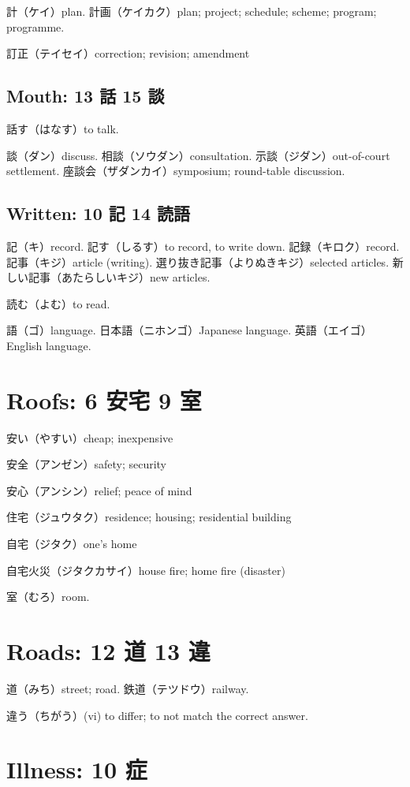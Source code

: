 計（ケイ）plan.
計画（ケイカク）plan; project; schedule; scheme; program; programme.

訂正（テイセイ）correction; revision; amendment

\subsection{Mouth: 13 話 15 談}

話す（はなす）to talk.

談（ダン）discuss.
相談（ソウダン）consultation.
示談（ジダン）out-of-court settlement.
座談会（ザダンカイ）symposium; round-table discussion.

\subsection{Written: 10 記 14 読語}

記（キ）record.
記す（しるす）to record, to write down.
記録（キロク）record.
記事（キジ）article (writing).
選り抜き記事（よりぬきキジ）selected articles.
新しい記事（あたらしいキジ）new articles.

読む（よむ）to read.

語（ゴ）language.
日本語（ニホンゴ）Japanese language.
英語（エイゴ）English language.

\section{Roofs: 6 安宅 9 室}

安い（やすい）cheap; inexpensive

安全（アンゼン）safety; security

安心（アンシン）relief; peace of mind

住宅（ジュウタク）residence; housing; residential building

自宅（ジタク）one's home

自宅火災（ジタクカサイ）house fire; home fire (disaster)

室（むろ）room.

\section{Roads: 12 道 13 違}

道（みち）street; road.
鉄道（テツドウ）railway.

違う（ちがう）(vi) to differ; to not match the correct answer.

\section{Illness: 10 症}

